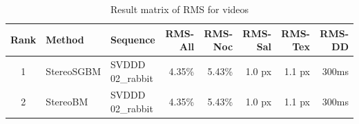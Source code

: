 \begin{landscape}
  \begin{table}[h!]
  \centering
  \begin{tabular}{cll|rrrrr}
    \hline
    \textbf{Rank} & \textbf{Method} & \textbf{Sequence} & \textbf{RMS-All} & \textbf{RMS-Noc} & \textbf{RMS-Sal} & \textbf{RMS-Tex} & \textbf{RMS-DD} \\ \hline \hline
    1 & StereoSGBM & SVDDD 02\_rabbit & 4.35\% & \cellcolor{green!60}5.43\% & 1.0 px & 1.1 px & 300ms \\
    2 & StereoBM & SVDDD 02\_rabbit & 4.35\% & 5.43\% & 1.0 px & \cellcolor{red!60}1.1 px & 300ms \\ \hline
  \end{tabular}
  \caption{Result matrix of RMS for videos}
  \label{tab:result-videos-rms}
  \end{table}
\end{landscape}

